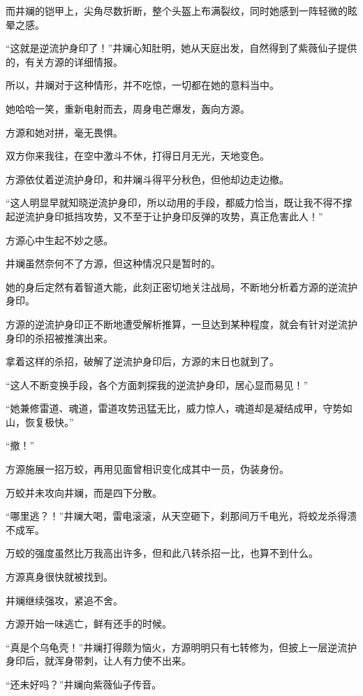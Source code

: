 \begin{this_body}
而井斓的铠甲上，尖角尽数折断，整个头盔上布满裂纹，同时她感到一阵轻微的眩晕之感。

“这就是逆流护身印了！”井斓心知肚明，她从天庭出发，自然得到了紫薇仙子提供的，有关方源的详细情报。

所以，井斓对于这种情形，并不吃惊，一切都在她的意料当中。

她哈哈一笑，重新电射而去，周身电芒爆发，轰向方源。

方源和她对拼，毫无畏惧。

双方你来我往，在空中激斗不休，打得日月无光，天地变色。

方源依仗着逆流护身印，和井斓斗得平分秋色，但他却边走边撤。

“这人明显早就知晓逆流护身印，所以动用的手段，都威力恰当，既让我不得不撑起逆流护身印抵挡攻势，又不至于让护身印反弹的攻势，真正危害此人！”

方源心中生起不妙之感。

井斓虽然奈何不了方源，但这种情况只是暂时的。

她的身后定然有着智道大能，此刻正密切地关注战局，不断地分析着方源的逆流护身印。

方源的逆流护身印正不断地遭受解析推算，一旦达到某种程度，就会有针对逆流护身印的杀招被推演出来。

拿着这样的杀招，破解了逆流护身印后，方源的末日也就到了。

“这人不断变换手段，各个方面刺探我的逆流护身印，居心显而易见！”

“她兼修雷道、魂道，雷道攻势迅猛无比，威力惊人，魂道却是凝结成甲，守势如山，恢复极快。”

“撤！”

方源施展一招万蛟，再用见面曾相识变化成其中一员，伪装身份。

万蛟并未攻向井斓，而是四下分散。

“哪里逃？！”井斓大喝，雷电滚滚，从天空砸下，刹那间万千电光，将蛟龙杀得溃不成军。

万蛟的强度虽然比万我高出许多，但和此八转杀招一比，也算不到什么。

方源真身很快就被找到。

井斓继续强攻，紧追不舍。

方源开始一味逃亡，鲜有还手的时候。

“真是个乌龟壳！”井斓打得颇为恼火，方源明明只有七转修为，但披上一层逆流护身印后，就浑身带刺，让人有力使不出来。

“还未好吗？”井斓向紫薇仙子传音。


\end{this_body}
